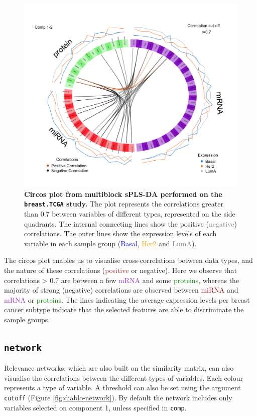 \documentclass[]{book}
\begin{document}
\begin{figure}

{\centering \includegraphics[width=0.5\linewidth]{Figures/DIABLO/diablo-circos-1} 

}

\caption{\textbf{Circos plot from multiblock sPLS-DA
performed on the \texttt{breast.TCGA} study.} The plot represents the
correlations greater than 0.7 between variables of different types,
represented on the side quadrants. The internal connecting lines show
the \textcolor{chocolate3}{positive} (\textcolor{grey}{negative})
correlations. The outer lines show the expression levels of each
variable in each sample group (\textcolor{blue}{Basal},
\textcolor{orange}{Her2} and \textcolor{grey}{LumA}).}\label{fig:diablo-circos}
\end{figure}










The circos plot enables us to visualise cross-correlations between data
types, and the nature of these correlations (\textcolor{brown}{positive}
or negative). Here we observe that correlations \textgreater{} 0.7 are
between a few \textcolor{darkorchid}{mRNA} and some
\textcolor{green}{proteins}, whereas the majority of strong (negative)
correlations are observed between \textcolor{darkred}{miRNA} and
\textcolor{darkorchid}{mRNA} or \textcolor{green}{proteins}. The lines
indicating the average expression levels per breast cancer subtype
indicate that the selected features are able to discriminate the sample
groups.

\subsection{\texorpdfstring{\texttt{network}}{network}}\label{network}

Relevance networks, which are also built on the similarity matrix, can
also visualise the correlations between the different types of
variables. Each colour represents a type of variable. A threshold can
also be set using the argument \texttt{cutoff} (Figure
\ref{fig:diablo-network}). By default the network includes only
variables selected on component 1, unless specified in \texttt{comp}.
\end{document}
